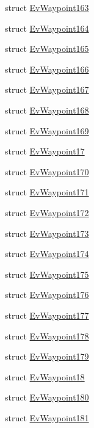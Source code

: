 \begin{DoxyCompactItemize}
\item 
struct \hyperlink{structcl__move__base__z_1_1EvWaypoint163}{Ev\+Waypoint163}
\item 
struct \hyperlink{structcl__move__base__z_1_1EvWaypoint164}{Ev\+Waypoint164}
\item 
struct \hyperlink{structcl__move__base__z_1_1EvWaypoint165}{Ev\+Waypoint165}
\item 
struct \hyperlink{structcl__move__base__z_1_1EvWaypoint166}{Ev\+Waypoint166}
\item 
struct \hyperlink{structcl__move__base__z_1_1EvWaypoint167}{Ev\+Waypoint167}
\item 
struct \hyperlink{structcl__move__base__z_1_1EvWaypoint168}{Ev\+Waypoint168}
\item 
struct \hyperlink{structcl__move__base__z_1_1EvWaypoint169}{Ev\+Waypoint169}
\item 
struct \hyperlink{structcl__move__base__z_1_1EvWaypoint17}{Ev\+Waypoint17}
\item 
struct \hyperlink{structcl__move__base__z_1_1EvWaypoint170}{Ev\+Waypoint170}
\item 
struct \hyperlink{structcl__move__base__z_1_1EvWaypoint171}{Ev\+Waypoint171}
\item 
struct \hyperlink{structcl__move__base__z_1_1EvWaypoint172}{Ev\+Waypoint172}
\item 
struct \hyperlink{structcl__move__base__z_1_1EvWaypoint173}{Ev\+Waypoint173}
\item 
struct \hyperlink{structcl__move__base__z_1_1EvWaypoint174}{Ev\+Waypoint174}
\item 
struct \hyperlink{structcl__move__base__z_1_1EvWaypoint175}{Ev\+Waypoint175}
\item 
struct \hyperlink{structcl__move__base__z_1_1EvWaypoint176}{Ev\+Waypoint176}
\item 
struct \hyperlink{structcl__move__base__z_1_1EvWaypoint177}{Ev\+Waypoint177}
\item 
struct \hyperlink{structcl__move__base__z_1_1EvWaypoint178}{Ev\+Waypoint178}
\item 
struct \hyperlink{structcl__move__base__z_1_1EvWaypoint179}{Ev\+Waypoint179}
\item 
struct \hyperlink{structcl__move__base__z_1_1EvWaypoint18}{Ev\+Waypoint18}
\item 
struct \hyperlink{structcl__move__base__z_1_1EvWaypoint180}{Ev\+Waypoint180}
\item 
struct \hyperlink{structcl__move__base__z_1_1EvWaypoint181}{Ev\+Waypoint181}

\end{DoxyCompactItemize}
